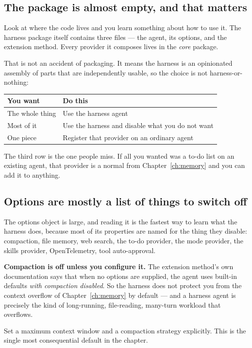 \subsection{The package is almost empty, and that matters}

Look at where the code lives and you learn something about how to use it. The
harness package itself contains three files --- the agent, its options, and the
extension method. Every provider it composes lives in the \emph{core} package.

That is not an accident of packaging. It means the harness is an opinionated
assembly of parts that are independently usable, so the choice is not
harness-or-nothing:

\begin{center}
\small
\begin{tabularx}{\linewidth}{@{}lX@{}}
\toprule
\textbf{You want} & \textbf{Do this} \\
\midrule
The whole thing & Use the harness agent \\[4pt]
Most of it & Use the harness and disable what you do not want \\[4pt]
One piece & Register that provider on an ordinary agent \\
\bottomrule
\end{tabularx}
\end{center}

\noindent
The third row is the one people miss. If all you wanted was a to-do list on an
existing agent, that provider is a normal  from
Chapter~\ref{ch:memory} and you can add it to anything.

\subsection{Options are mostly a list of things to switch off}

The options object is large, and reading it is the fastest way to learn what the
harness does, because most of its properties are named for the thing they
disable: compaction, file memory, web search, the to-do provider, the mode
provider, the skills provider, OpenTelemetry, tool auto-approval.

\begin{warning}
\textbf{Compaction is off unless you configure it.} The extension method's own
documentation says that when no options are supplied, the agent uses built-in
defaults \emph{with compaction disabled}. So the harness does not protect you
from the context overflow of Chapter~\ref{ch:memory} by default --- and a harness
agent is precisely the kind of long-running, file-reading, many-turn workload
that overflows.

Set a maximum context window and a compaction strategy explicitly. This is the
single most consequential default in the chapter.
\end{warning}

